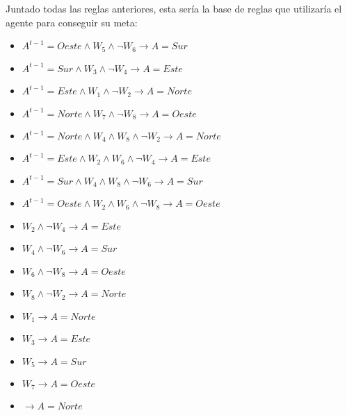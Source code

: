 Juntado todas las reglas anteriores, esta sería la base de reglas que utilizaría el agente para conseguir su meta:

\begin{itemize}
    \item \emph{$A^{t-1} = Oeste \land W_{5} \land \neg W_{6} \longrightarrow A = Sur $}
    \item \emph{$A^{t-1} = Sur \land W_{3} \land \neg W_{4} \longrightarrow A = Este $}
    \item \emph{$A^{t-1} = Este \land W_{1} \land \neg W_{2} \longrightarrow A = Norte $}
    \item \emph{$A^{t-1} = Norte \land W_{7} \land \neg W_{8} \longrightarrow A = Oeste $}
    \item \emph{$A^{t-1} = Norte \land W_{4} \land W_{8} \land \neg W_{2} \longrightarrow A = Norte $}
    \item \emph{$A^{t-1} = Este \land W_{2} \land W_{6} \land \neg W_{4} \longrightarrow A = Este $}
    \item \emph{$A^{t-1} = Sur \land W_{4} \land W_{8} \land \neg W_{6} \longrightarrow A = Sur $}
    \item \emph{$A^{t-1} = Oeste \land W_{2} \land W_{6} \land \neg W_{8} \longrightarrow A = Oeste $}
    \item \emph{$W_{2} \land \neg W_{4} \longrightarrow A = Este$}
    \item \emph{$W_{4} \land \neg W_{6} \longrightarrow A = Sur$}
    \item \emph{$W_{6} \land \neg W_{8} \longrightarrow A = Oeste$}
    \item \emph{$W_{8} \land \neg W_{2} \longrightarrow A = Norte$}
    \item \emph{$W_{1} \longrightarrow A = Norte$}
    \item \emph{$W_{3} \longrightarrow A = Este$}
    \item \emph{$W_{5} \longrightarrow A = Sur$}
    \item \emph{$W_{7} \longrightarrow A = Oeste$}
    \item \emph{$\longrightarrow A = Norte$}
\end{itemize}